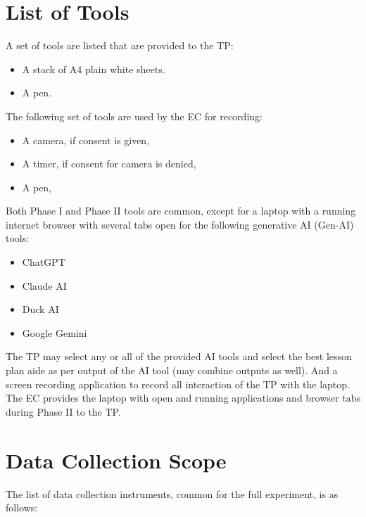 \section{List of Tools}

A set of tools are listed that are provided to the TP:
\begin{itemize}
    \item A stack of A4 plain white sheets.
    \item A pen.
\end{itemize}

\vspace{5mm}

\noindent The following set of tools are used by the EC for recording:
\begin{itemize}
    \item A camera, if consent is given,
    \item A timer, if consent for camera is denied,
    \item A pen,
\end{itemize}

\vspace{5mm}

\noindent Both Phase I and Phase II tools are common, except for a laptop with a running internet browser with several tabs open for the following generative AI (Gen-AI) tools:

\begin{itemize}
    \item ChatGPT
    \item Claude AI
    \item Duck AI
    \item Google Gemini
\end{itemize}

\vspace{5mm}


\noindent The TP may select any or all of the provided AI tools and select the best lesson plan aide as per output of the AI tool (may combine outputs as well).
And a screen recording application to record all interaction of the TP with the laptop.
The EC provides the laptop with open and running applications and browser tabs during Phase II to the TP.

\section{Data Collection Scope}

The list of data collection instruments, common for the full experiment, is as follows:

